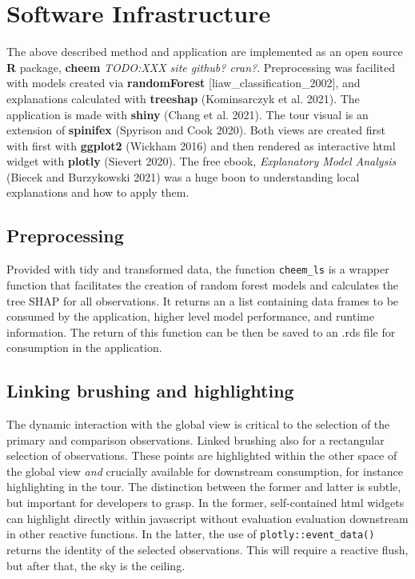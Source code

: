 \documentclass[
]{article}
\begin{document}
\hypertarget{sec:softwareinfrastructure}{%
\section{Software Infrastructure}\label{sec:softwareinfrastructure}}

The above described method and application are implemented as an open source \textbf{R} package, \textbf{cheem} \emph{TODO:XXX site github? cran?}. Preprocessing was facilited with models created via \textbf{randomForest} {[}liaw\_classification\_2002{]}, and explanations calculated with \textbf{treeshap} (Kominsarczyk et al. 2021).
The application is made with \textbf{shiny} (Chang et al. 2021). The tour visual is an extension of \textbf{spinifex} (Spyrison and Cook 2020). Both views are created first with first with \textbf{ggplot2} (Wickham 2016) and then rendered as interactive html widget with \textbf{plotly} (Sievert 2020). The free ebook, \emph{Explanatory Model Analysis} (Biecek and Burzykowski 2021) was a huge boon to understanding local explanations and how to apply them.

\hypertarget{preprocessing-1}{%
\subsection{Preprocessing}\label{preprocessing-1}}

Provided with tidy and transformed data, the function \texttt{cheem\_ls} is a wrapper function that facilitates the creation of random forest models and calculates the tree SHAP for all observations. It returns an a list containing data frames to be consumed by the application, higher level model performance, and runtime information. The return of this function can be then be saved to an .rds file for consumption in the application.

\hypertarget{linking-brushing-and-highlighting}{%
\subsection{Linking brushing and highlighting}\label{linking-brushing-and-highlighting}}

The dynamic interaction with the global view is critical to the selection of the primary and comparison observations. Linked brushing also for a rectangular selection of observations. These points are highlighted within the other space of the global view \emph{and} crucially available for downstream consumption, for instance highlighting in the tour. The distinction between the former and latter is subtle, but important for developers to grasp. In the former, self-contained html widgets can highlight directly within javascript without evaluation evaluation downstream in other reactive functions. In the latter, the use of \texttt{plotly::event\_data()} returns the identity of the selected observations. This will require a reactive flush, but after that, the sky is the ceiling.
\end{document}

